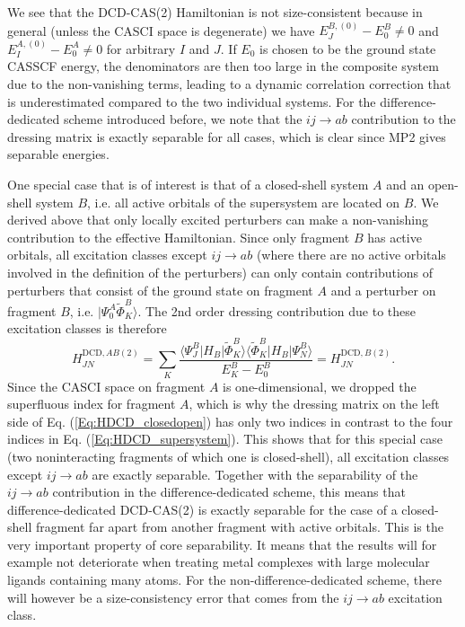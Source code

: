 We see that the DCD-CAS(2) Hamiltonian is not size-consistent because in general (unless the CASCI space is degenerate) we have $E_J^{B,(0)} - E_0^B \ne 0$ and $E_I^{A,(0)} - E_0^A \ne 0$ for arbitrary $I$ and $J$. If ${E_0}$ is chosen to be the ground state CASSCF energy, the denominators are then too large in the composite system due to the non-vanishing terms, leading to a dynamic correlation correction that is underestimated compared to the two individual systems.
For the difference-dedicated scheme introduced before, we note that the $ij\rightarrow ab$ contribution to the dressing matrix is exactly separable for all cases, which is clear since MP2 gives separable energies.

One special case that is of interest is that of a closed-shell system $A$ and an open-shell system $B$, i.e. all active orbitals of the supersystem are located on $B$. We derived above that only locally excited perturbers can make a non-vanishing contribution to the effective Hamiltonian. Since only fragment $B$ has active orbitals, all excitation classes except $ij\rightarrow ab$ (where there are no active orbitals involved in the definition of the perturbers) can only contain contributions of perturbers that consist of the ground state on fragment $A$ and a perturber on fragment $B$, i.e. $|\Psi_0^A \tilde{\Phi}_K^B\rangle$. The 2nd order dressing contribution due to these excitation classes is therefore
\begin{equation}
\label{Eq:HDCD_closedopen}
H_{JN}^{\text{DCD}, AB(2)}= \sum_K \frac{\langle \Psi_J^B | H_B | \tilde{\Phi}_K^B\rangle \langle \tilde{\Phi}_K^B | H_B | \Psi_N^B\rangle}{E_K^B - E_0^B} = H_{JN}^{\text{DCD}, B(2)}.
\end{equation}
Since the CASCI space on fragment $A$ is one-dimensional, we dropped the superfluous index for fragment $A$, which is why the dressing matrix on the left side of Eq. (\ref{Eq:HDCD_closedopen}) has only two indices in contrast to the four indices in Eq. (\ref{Eq:HDCD_supersystem}).
This shows that for this special case (two noninteracting fragments of which one is closed-shell), all excitation classes except $ij\rightarrow ab$ are exactly separable.
Together with the separability of the $ij\rightarrow ab$ contribution in the difference-dedicated scheme, this means that difference-dedicated DCD-CAS(2) is exactly separable for the case of a closed-shell fragment far apart from another fragment with active orbitals. This is the very important property of core separability.\cite{Grano_2011_214113} It means that the results will for example not deteriorate when treating metal complexes with large molecular ligands containing many atoms. For the non-difference-dedicated scheme, there will however be a size-consistency error that comes from the $ij\rightarrow ab$ excitation class.

